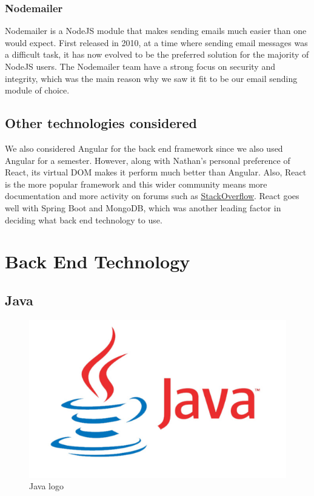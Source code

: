 \subsubsection{Nodemailer}
Nodemailer is a NodeJS module that makes sending emails much easier than one would expect. First released in 2010, at a time where sending email messages was a difficult task, it has now evolved to be the preferred solution for the majority of NodeJS users.
The Nodemailer team have a strong focus on security and integrity, which was the main reason why we saw it fit to be our email sending module of choice.

\subsection{Other technologies considered}
We also considered Angular for the back end framework since we also used Angular for a semester. However, along with Nathan's personal preference of React, its virtual DOM makes it perform much better than Angular. Also, React is the more popular framework and this wider community means more documentation and more activity on forums such as \underline{\href{https://stackoverflow.com}{StackOverflow}}. React goes well with Spring Boot and MongoDB, which was another leading factor in deciding what back end technology to use. \par

\section{Back End Technology}

\subsection{Java}
\begin{figure}[th]
\renewcommand\thefigure{3.2}
\centering
\includegraphics[scale = 0.31]{img/java-logo-1.png}
\caption{Java logo}
\label{Java}
\end{figure}
\newpage

